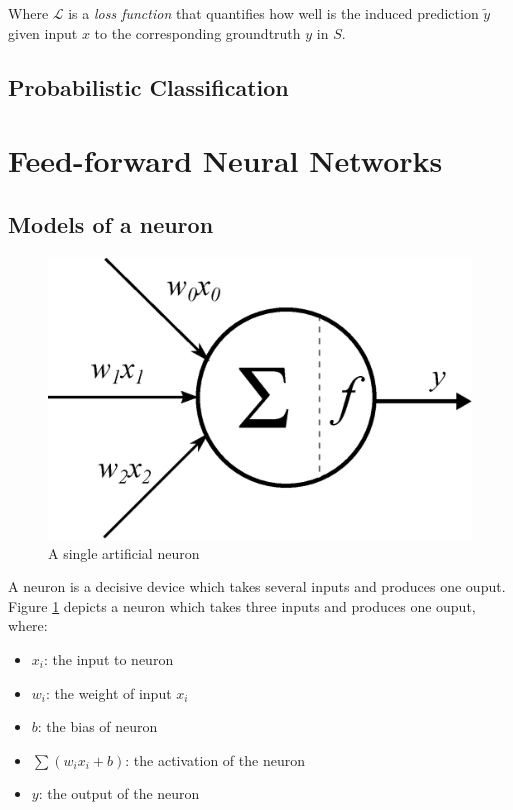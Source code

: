Where $\mathcal{L}$ is a \textit{loss function} that quantifies how well is the induced prediction $\tilde{y}$ given input $x$ to the corresponding groundtruth $y$ in $S$.

\subsection{Probabilistic Classification }


\section{Feed-forward Neural Networks}
\label{sec:ff}

\subsection{Models of a neuron}

\begin{figure}
	\vspace{-20pt} %
	\centering
	\includegraphics[scale=0.35]{Chapters/Fig/neuron.eps}
	\caption{A single artificial neuron}
	\label{fig:neuron}
	\vspace{-25pt} %
\end{figure}

A neuron is a decisive device which takes several inputs and produces one ouput. Figure \ref{fig:neuron} depicts a neuron which takes three inputs and produces one ouput, where:
\begin{itemize}[noitemsep]
	\item $x_i$: the input to neuron
	\item $w_i$: the weight of input $x_i$
	\item $b$: the bias of neuron
	\item $\sum\left(w_ix_i + b\right)$: the activation of the neuron
	\item $y$: the output of the neuron
\end{itemize}

